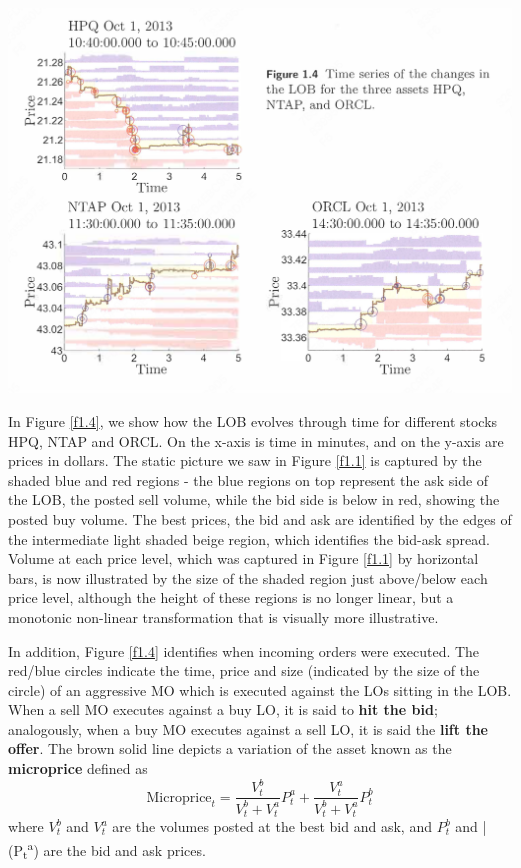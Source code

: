 \documentclass[11pt]{article}
\begin{document}
\begin{center}
\includegraphics[width=.8\textwidth]{../images/Misc/18.png}
\label{f1.4}
\end{center}

In Figure \ref{f1.4}, we show how the LOB evolves through time for different stocks HPQ, NTAP and ORCL.
On the x-axis is time in minutes, and on the y-axis are prices in dollars. The static picture we saw
in Figure \ref{f1.1} is captured by the shaded blue and red regions - the blue regions on top represent
the ask side of the LOB, the posted sell volume, while the bid side is below in red, showing the
posted buy volume. The best prices, the bid and ask are identified by the edges of the intermediate
light shaded beige region, which identifies the bid-ask spread. Volume at each price level, which was
captured in Figure \ref{f1.1} by horizontal bars, is now illustrated by the size of the shaded region just
above/below each price level, although the height of these regions is no longer linear, but a
monotonic non-linear transformation that is visually more illustrative.

In addition, Figure \ref{f1.4} identifies when incoming orders were executed. The red/blue circles
indicate the time, price and size (indicated by the size of the circle) of an aggressive MO which is
executed against the LOs sitting in the LOB. When a sell MO executes against a buy LO, it is said to
\textbf{hit the bid}; analogously, when a buy MO executes against a sell LO, it is said the \textbf{lift the offer}. The
brown solid line depicts a variation of the asset known as the \textbf{microprice} defined as
\begin{equation*}
\text{Microprice}_t=\frac{V_t^b}{V_t^b+V_t^a}P_t^a+\frac{V_t^a}{V_t^b+V_t^a}P_t^b
\end{equation*}
where \(V_t^b\) and \(V_t^a\) are the volumes posted at the best bid and ask, and \(P_t^b\)
and |(P\textsubscript{t}\textsuperscript{a}) are the bid and ask prices.
\end{document}
